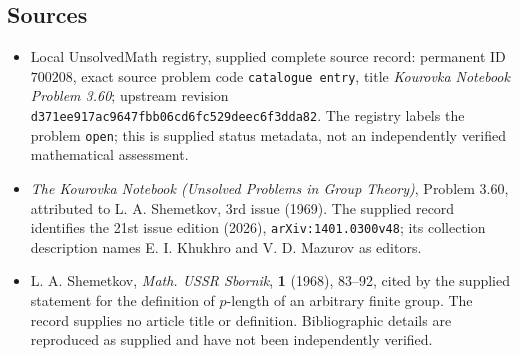 \documentclass[11pt]{article}
\begin{document}
\subsection{Sources}
\begin{itemize}
\item Local UnsolvedMath registry, supplied complete source record: permanent ID \(700208\), exact source problem code \texttt{catalogue entry}, title \emph{Kourovka Notebook Problem 3.60}; upstream revision \texttt{d371ee917ac9647fbb06cd6fc529deec6f3dda82}. The registry labels the problem \texttt{open}; this is supplied status metadata, not an independently verified mathematical assessment.
\item \emph{The Kourovka Notebook (Unsolved Problems in Group Theory)}, Problem 3.60, attributed to L. A. Shemetkov, 3rd issue (1969). The supplied record identifies the 21st issue edition (2026), \texttt{arXiv:1401.0300v48}; its collection description names E. I. Khukhro and V. D. Mazurov as editors.
\item L. A. Shemetkov, \emph{Math. USSR Sbornik}, \textbf{1} (1968), 83--92, cited by the supplied statement for the definition of \(p\)-length of an arbitrary finite group. The record supplies no article title or definition. Bibliographic details are reproduced as supplied and have not been independently verified.
\end{itemize}
\end{document}
